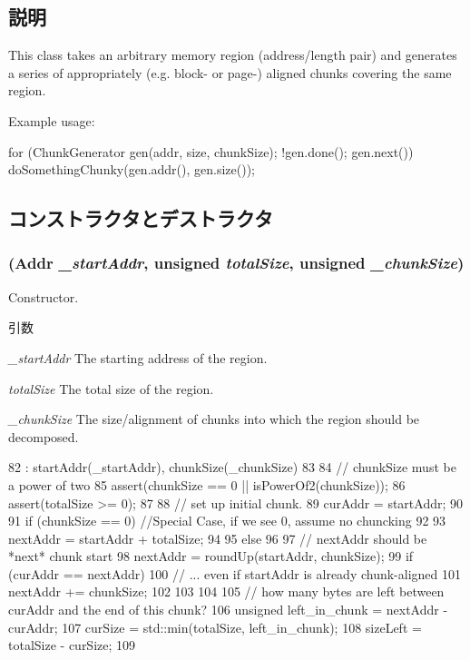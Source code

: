 \subsection{説明}
This class takes an arbitrary memory region (address/length pair) and generates a series of appropriately (e.g. block-\/ or page-\/) aligned chunks covering the same region.

Example usage:


\begin{DoxyCode}
    for (ChunkGenerator gen(addr, size, chunkSize); !gen.done(); gen.next()) {
        doSomethingChunky(gen.addr(), gen.size());
    }
\end{DoxyCode}
 

\subsection{コンストラクタとデストラクタ}
\hypertarget{classChunkGenerator_a9dda668a747384202dd80c58a86c9b6a}{
\subsubsection[{ChunkGenerator}]{ ({\bf Addr} {\em \_\-startAddr}, \/  unsigned {\em totalSize}, \/  unsigned {\em \_\-chunkSize})}}
\label{classChunkGenerator_a9dda668a747384202dd80c58a86c9b6a}
Constructor. 
\begin{DoxyParams}{引数}
\item[{\em \_\-startAddr}]The starting address of the region. \item[{\em totalSize}]The total size of the region. \item[{\em \_\-chunkSize}]The size/alignment of chunks into which the region should be decomposed. \end{DoxyParams}



\begin{DoxyCode}
82         : startAddr(_startAddr), chunkSize(_chunkSize)
83     {
84         // chunkSize must be a power of two
85         assert(chunkSize == 0 || isPowerOf2(chunkSize));
86         assert(totalSize >= 0);
87 
88         // set up initial chunk.
89         curAddr = startAddr;
90 
91         if (chunkSize == 0) //Special Case, if we see 0, assume no chuncking
92         {
93             nextAddr = startAddr + totalSize;
94         }
95         else
96         {
97             // nextAddr should be *next* chunk start
98             nextAddr = roundUp(startAddr, chunkSize);
99             if (curAddr == nextAddr) {
100                 // ... even if startAddr is already chunk-aligned
101                 nextAddr += chunkSize;
102             }
103         }
104 
105         // how many bytes are left between curAddr and the end of this chunk?
106         unsigned left_in_chunk = nextAddr - curAddr;
107         curSize = std::min(totalSize, left_in_chunk);
108         sizeLeft = totalSize - curSize;
109     }
\end{DoxyCode}


